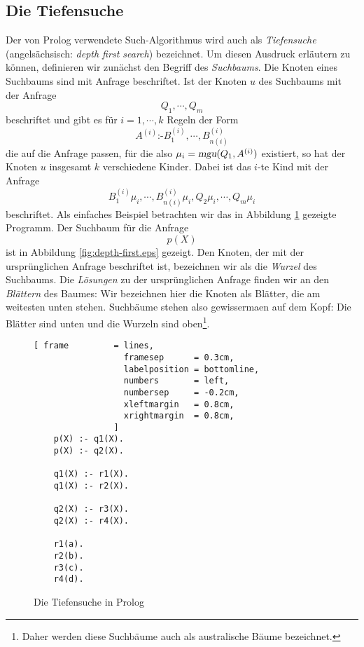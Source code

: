 \subsection{Die Tiefensuche}
Der von Prolog verwendete Such-Algorithmus wird auch als \emph{Tiefensuche} (angels\"{a}chsisch:
\emph{depth first search}) bezeichnet.  Um diesen Ausdruck erl\"{a}utern zu k\"{o}nnen, definieren wir
zun\"{a}chst den Begriff des \emph{Suchbaums}.  Die Knoten eines Suchbaums sind mit Anfrage beschriftet.
Ist der Knoten $u$ des Suchbaums mit der Anfrage
\[ Q_1, \cdots, Q_m \]
beschriftet und gibt es f\"{u}r $i = 1,\cdots,k$ Regeln der Form
\[ A^{(i)} \texttt{:-} B_1^{(i)}, \cdots, B_{n(i)}^{(i)} \]
die auf die Anfrage passen, f\"{u}r die also $\mu_i = \textsl{mgu}(Q_1, A^{(i)})$ existiert, so hat der
Knoten $u$ insgesamt $k$ verschiedene Kinder.  Dabei ist das $i$-te Kind mit der Anfrage
\[  B_1^{(i)}\mu_i, \cdots, B_{n(i)}^{(i)}\mu_i, Q_2\mu_i, \cdots, Q_m\mu_i \]
beschriftet.  Als einfaches Beispiel betrachten wir das in Abbildung \ref{fig:depth.pl} gezeigte
Programm.  Der Suchbaum f\"{u}r die Anfrage
\[ p(X) \]
ist in Abbildung \ref{fig:depth-first.eps} gezeigt.  Den Knoten, der mit der urspr\"{u}nglichen Anfrage
beschriftet ist, bezeichnen wir als die \emph{Wurzel} des Suchbaums.  Die \emph{L\"{o}sungen} zu der
urspr\"{u}nglichen Anfrage finden wir an den \emph{Bl\"{a}ttern} des Baumes: Wir bezeichnen hier die Knoten
als Bl\"{a}tter, die am weitesten unten stehen.  Suchb\"{a}ume stehen also gewisserma\3en auf dem Kopf: Die
Bl\"{a}tter sind unten und die Wurzeln sind oben\footnote{
Daher werden diese Suchb\"{a}ume auch als australische B\"{a}ume bezeichnet.}.

\begin{figure}[!ht]
\centering
\begin{Verbatim}[ frame         = lines, 
                  framesep      = 0.3cm, 
                  labelposition = bottomline,
                  numbers       = left,
                  numbersep     = -0.2cm,
                  xleftmargin   = 0.8cm,
                  xrightmargin  = 0.8cm,
                ]
    p(X) :- q1(X).
    p(X) :- q2(X).
    
    q1(X) :- r1(X). 
    q1(X) :- r2(X). 
    
    q2(X) :- r3(X). 
    q2(X) :- r4(X). 
    
    r1(a).
    r2(b).
    r3(c).
    r4(d).
\end{Verbatim}
\vspace*{-0.3cm}
\caption{Die Tiefensuche in Prolog}
\label{fig:depth.pl}
\end{figure}

